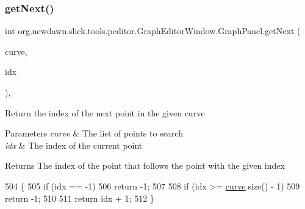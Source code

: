 \subsubsection{\texorpdfstring{get\+Next()}{getNext()}}
{\footnotesize\ttfamily int org.\+newdawn.\+slick.\+tools.\+peditor.\+Graph\+Editor\+Window.\+Graph\+Panel.\+get\+Next (\begin{DoxyParamCaption}\item[{Array\+List}]{curve,  }\item[{int}]{idx }\end{DoxyParamCaption})\hspace{0.3cm}{\ttfamily [inline]}, {\ttfamily [private]}}

Return the index of the next point in the given curve


\begin{DoxyParams}{Parameters}
{\em curve} & The list of points to search \\
\hline
{\em idx} & The index of the current point \\
\hline
\end{DoxyParams}
\begin{DoxyReturn}{Returns}
The index of the point that follows the point with the given index 
\end{DoxyReturn}

\begin{DoxyCode}
504                                                       \{
505             \textcolor{keywordflow}{if} (idx == -1)
506                 \textcolor{keywordflow}{return} -1;
507 
508             \textcolor{keywordflow}{if} (idx >= \mbox{\hyperlink{classorg_1_1newdawn_1_1slick_1_1tools_1_1peditor_1_1_graph_editor_window_1_1_graph_panel_ac95a7a77b5e8460041f157c02e19d2bb}{curve}}.size() - 1)
509                 \textcolor{keywordflow}{return} -1;
510 
511             \textcolor{keywordflow}{return} idx + 1;
512         \}
\end{DoxyCode}
\mbox{\label{classorg_1_1newdawn_1_1slick_1_1tools_1_1peditor_1_1_graph_editor_window_1_1_graph_panel_a4c94c9af840a0b38446fcf8752521555}} 

